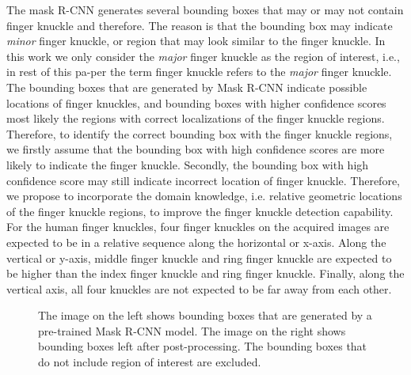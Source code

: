 The mask R-CNN generates several bounding boxes that may or may not contain finger knuckle and therefore. The reason is that the bounding box may indicate \textit{minor} finger knuckle, or region that may look similar to the finger knuckle. In this work we only consider the \textit{major} finger knuckle as the region of interest, i.e., in rest of this pa-per the term finger knuckle refers to the \textit{major} finger knuckle. The bounding boxes that are generated by Mask R-CNN indicate possible locations of finger knuckles, and bounding boxes with higher confidence scores most likely the regions with correct localizations of the finger knuckle regions. Therefore, to identify the correct bounding box with the finger knuckle regions, we firstly assume that the bounding box with high confidence scores are more likely to indicate the finger knuckle. Secondly, the bounding box with high confidence score may still indicate incorrect location of finger knuckle. Therefore, we propose to incorporate the domain knowledge, i.e. relative geometric locations of the finger knuckle regions, to improve the finger knuckle detection capability. For the human finger knuckles, four finger knuckles on the acquired images are expected to be in a relative sequence along the horizontal or x-axis. Along the vertical or y-axis, middle finger knuckle and ring finger knuckle are expected to be higher than the index finger knuckle and ring finger knuckle. Finally, along the vertical axis, all four knuckles are not expected to be far away from each other.

\begin{figure}[ht!]
    \centering

    \caption{The image on the left shows bounding boxes that are generated by a pre-trained Mask R-CNN model. The image on the right shows bounding boxes left after post-processing. The bounding boxes that do not include region of interest are excluded.}
    \label{select-finger-knuckle}
\end{figure}

